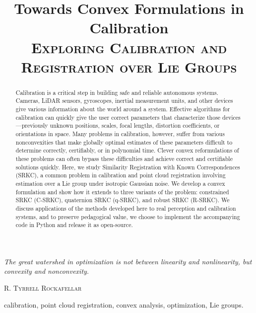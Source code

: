 \documentclass[conference]{IEEEtran}
\begin{document}
\title{Towards Convex Formulations in Calibration
\\ {\Large \textsc{Exploring Calibration and Registration over Lie Groups}}
}

\author{


}

\maketitle

\setlength{\epigraphwidth}{\columnwidth}
\epigraph{\textit{The great watershed in optimization is not between linearity and nonlinearity, but convexity and nonconvexity.}}{\vspace*{1.8mm}\textsc{R. Tyrrell Rockafellar}}

\begin{abstract}
Calibration is a critical step in building safe and reliable autonomous systems.  Cameras, LiDAR sensors, gyroscopes, inertial measurement units, and other devices give various information about the world around a system.  Effective algorithms for calibration can quickly give the user correct parameters that characterize those devices---previously unknown positions, scales, focal lengths, distortion coefficients, or orientations in space.  Many problems in calibration, however, suffer from various nonconvexities that make globally optimal estimates of these parameters difficult to determine correctly, certifiably, or in polynomial time.  Clever convex reformulations of these problems can often bypass these difficulties and achieve correct and certifiable solutions quickly.  Here, we study Similarity Registration with Known Correspondences (SRKC), a common problem in calibration and point cloud registration involving estimation over a Lie group under isotropic Gaussian noise.  We develop a convex formulation and show how it extends to three variants of the problem: constrained SRKC (C-SRKC), quaternion SRKC (q-SRKC), and robust SRKC (R-SRKC).  We discuss applications of the methods developed here to real perception and calibration systems, and to preserve pedagogical value, we choose to implement the accompanying code in Python and release it as open-source.
\end{abstract}

\begin{IEEEkeywords}
calibration, point cloud registration, convex analysis, optimization, Lie groups.
\end{IEEEkeywords}
\end{document}
